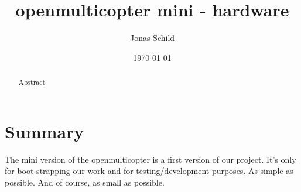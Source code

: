 \documentclass[11pt, a4paper]{article}
\title{openmulticopter mini - hardware}
\author{Jonas Schild}
\date{\today}
\begin{document}
\maketitle

\begin{abstract}
Abstract
\end{abstract}

\newpage

\tableofcontents

\section{Summary} %
\label{sec:Summary}
The mini version of the openmulticopter is a first version of our project. It’s only for boot strapping our work and for testing/development purposes. As simple as possible. And of course, as small as possible.
\end{document}
